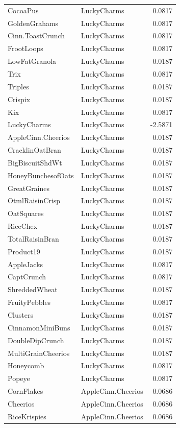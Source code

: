 \begin{longtable}{llr}
CocoaPus & LuckyCharms & 0.0817 \\
GoldenGrahams & LuckyCharms & 0.0817 \\
Cinn.ToastCrunch & LuckyCharms & 0.0817 \\
FrootLoops & LuckyCharms & 0.0817 \\
LowFatGranola & LuckyCharms & 0.0187 \\
Trix & LuckyCharms & 0.0817 \\
Triples & LuckyCharms & 0.0187 \\
Crispix & LuckyCharms & 0.0187 \\
Kix & LuckyCharms & 0.0817 \\
LuckyCharms & LuckyCharms & -2.5871 \\
AppleCinn.Cheerios & LuckyCharms & 0.0187 \\
CracklinOatBran & LuckyCharms & 0.0187 \\
BigBiscuitShdWt & LuckyCharms & 0.0187 \\
HoneyBunchesofOats & LuckyCharms & 0.0187 \\
GreatGraines & LuckyCharms & 0.0187 \\
OtmlRaisinCrisp & LuckyCharms & 0.0187 \\
OatSquares & LuckyCharms & 0.0187 \\
RiceChex & LuckyCharms & 0.0187 \\
TotalRaisinBran & LuckyCharms & 0.0187 \\
Product19 & LuckyCharms & 0.0187 \\
AppleJacks & LuckyCharms & 0.0817 \\
CaptCrunch & LuckyCharms & 0.0817 \\
ShreddedWheat & LuckyCharms & 0.0187 \\
FruityPebbles & LuckyCharms & 0.0817 \\
Clusters & LuckyCharms & 0.0187 \\
CinnamonMiniBuns & LuckyCharms & 0.0187 \\
DoubleDipCrunch & LuckyCharms & 0.0187 \\
MultiGrainCheerios & LuckyCharms & 0.0187 \\
Honeycomb & LuckyCharms & 0.0817 \\
Popeye & LuckyCharms & 0.0817 \\
CornFlakes & AppleCinn.Cheerios & 0.0686 \\
Cheerios & AppleCinn.Cheerios & 0.0686 \\
RiceKrispies & AppleCinn.Cheerios & 0.0686 \\

\end{longtable}
